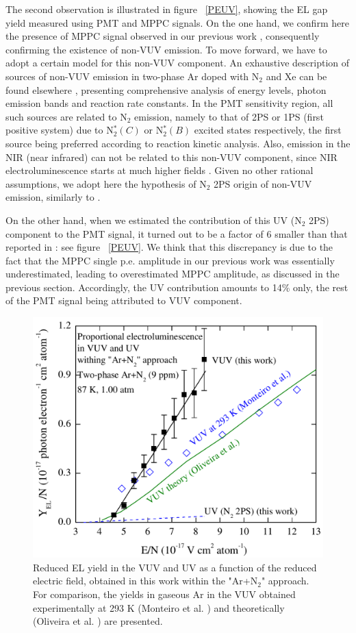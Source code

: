 \documentclass[a4paper,11pt]{article}
\begin{document}
The second observation is illustrated in figure ~\ref{PEUV}, showing the EL gap yield measured using PMT and MPPC signals. On the one hand, we confirm here the presence of MPPC signal observed in our previous work \cite{CRADPropEL15}, consequently confirming the existence of non-VUV emission. To move forward, we have to adopt a certain model for this non-VUV component. An exhaustive description of sources of non-VUV emission in two-phase Ar doped with N$_2$ and Xe can be found elsewhere \cite{ArXeN2Proc17}, presenting comprehensive analysis of energy levels, photon emission bands and reaction rate constants. In the PMT sensitivity region, all such sources are related to N$_2$ emission, namely to that of 2PS or 1PS (first positive system) due to N$_2^{\ast}(C)$ or N$_2^{\ast}(B)$ excited states respectively, the first source being preferred according to reaction kinetic analysis. Also, emission in the NIR (near infrared) can not be related to this non-VUV component, since NIR electroluminescence starts at much higher fields \cite{CRADProject12}. Given no other rational assumptions, we adopt here the hypothesis of N$_2$ 2PS origin of non-VUV emission, similarly to \cite{CRADPropEL15}.


On the other hand, when we estimated the contribution of this UV (N$_2$ 2PS) component to the PMT signal, it turned out to be a factor of 6 smaller than that reported in \cite{CRADPropEL15}: see figure ~\ref{PEUV}. We think that this discrepancy is due to the fact that the MPPC single p.e. amplitude in our previous work \cite{CRADPropEL15}  was essentially underestimated, leading to overestimated MPPC amplitude, as discussed in the previous section. Accordingly, the UV contribution amounts to 14\% only, the rest of the PMT signal being attributed to VUV component.

\begin{figure}[hbt]
	\centering
	\includegraphics[width=0.6\columnwidth,keepaspectratio]{fig7}
	\caption{
		Reduced EL yield in the VUV and UV as a function of the reduced electric field, obtained in this work within the "Ar+N$_2$" approach. For  comparison, the yields in gaseous Ar in the VUV obtained experimentally at 293 K (Monteiro et al. \cite{ArELExp08}) and theoretically (Oliveira et al. \cite{ArELTheory11}) are presented.
	}
	\label{PE2PS}
\end{figure}
\end{document}
